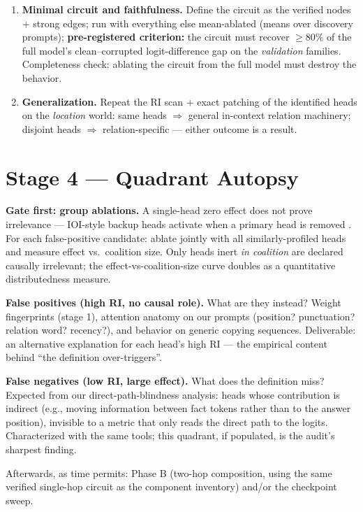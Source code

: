 \documentclass[11pt,a4paper]{article}
\begin{document}
\begin{enumerate}[itemsep=2pt]
\item \textbf{Minimal circuit and faithfulness.} Define the circuit as the verified nodes + strong edges; run with everything else mean-ablated (means over discovery prompts); \textbf{pre-registered criterion:} the circuit must recover $\ge 80\%$ of the full model's clean--corrupted logit-difference gap on the \emph{validation} families. Completeness check: ablating the circuit from the full model must destroy the behavior.
\item \textbf{Generalization.} Repeat the RI scan + exact patching of the identified heads on the \emph{location} world: same heads $\Rightarrow$ general in-context relation machinery; disjoint heads $\Rightarrow$ relation-specific --- either outcome is a result.
\end{enumerate}

\section{Stage 4 --- Quadrant Autopsy}
\textbf{Gate first: group ablations.} A single-head zero effect does not prove irrelevance --- IOI-style backup heads activate when a primary head is removed \cite{ioi}. For each false-positive candidate: ablate jointly with all similarly-profiled heads and measure effect vs.\ coalition size. Only heads inert \emph{in coalition} are declared causally irrelevant; the effect-vs-coalition-size curve doubles as a quantitative distributedness measure.

\textbf{False positives (high RI, no causal role).} What are they instead? Weight fingerprints (stage 1), attention anatomy on our prompts (position? punctuation? relation word? recency?), and behavior on generic copying sequences. Deliverable: an alternative explanation for each head's high RI --- the empirical content behind ``the definition over-triggers''.

\textbf{False negatives (low RI, large effect).} What does the definition miss? Expected from our direct-path-blindness analysis: heads whose contribution is indirect (e.g., moving information between fact tokens rather than to the answer position), invisible to a metric that only reads the direct path to the logits. Characterized with the same tools; this quadrant, if populated, is the audit's sharpest finding.

Afterwards, as time permits: Phase B (two-hop composition, using the same verified single-hop circuit as the component inventory) and/or the checkpoint sweep.
\end{document}
